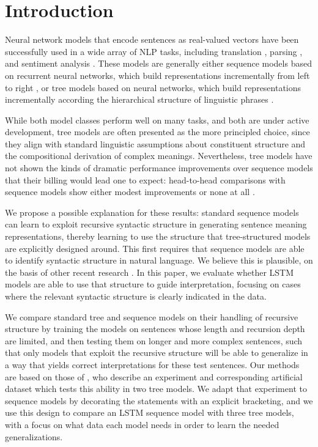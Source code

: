 \section{Introduction}\label{sec:intro}

Neural network models that encode sentences as real-valued vectors have been successfully used in a wide array of NLP tasks, including translation \cite{sutskever2014sequence}, parsing \cite{dyer2015transition}, and sentiment analysis \cite{tai2015improved}. 
These models are generally either 
sequence models based on recurrent neural networks, which build representations incrementally from left to right \cite{elman1990finding,sutskever2014sequence}, or tree models based on  neural networks, which build representations incrementally according the hierarchical structure of linguistic phrases \cite{goller1996learning,socher2011semi}. 

While both model classes perform %
well on many tasks, and both are under active development,
tree models are often presented as the more principled choice, since they align with standard linguistic assumptions about constituent structure and the compositional derivation of complex meanings.
Nevertheless,
tree models have not shown the kinds of dramatic performance improvements over sequence models that their billing would lead one to expect: head-to-head comparisons with sequence models show either modest improvements \cite{tai2015improved} or none at all \cite{li2015tree}. 

We propose a possible explanation for these results: standard sequence models can learn to
exploit recursive syntactic structure in generating sentence meaning representations, thereby 
learning to use the 
structure that tree-structured models are explicitly designed around. This first requires that
sequence models are able to identify syntactic structure in natural language. We believe this is plausible, on the basis of other recent research \cite{vinyals2014grammar,Karpathy2015vaurn}. %
In this paper, we  evaluate whether LSTM models are able to use that structure to guide interpretation, 
focusing on cases where the relevant syntactic structure is clearly indicated in the data.

We compare standard tree and sequence models on their handling of recursive structure by training the models on sentences whose length and recursion depth are limited, and then testing them on longer and more complex sentences, such that only models that exploit the recursive structure will be able to generalize in a way that yields correct interpretations for these test sentences. Our methods are based on those of , who describe an experiment and corresponding artificial dataset which tests this ability in two tree models. We adapt that experiment to sequence models by decorating the statements with an explicit bracketing, and we use this design to compare an LSTM sequence model with three tree models, with a focus on what data each model needs in order to learn the needed generalizations.

